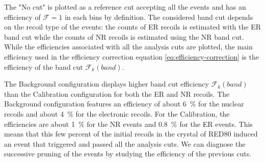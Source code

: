 The "No cut" is plotted as a reference cut accepting all the events and has an efficiency of $\mathcal{F}=1$ in each bins by definition. The considered band cut depends on the recoil type of the events: the counts of ER recoils is estimated with the ER band cut while the counts of NR recoils is estimated using the NR band cut.
While the efficiencies associated with all the analysis cuts are plotted, the main efficiency used in the efficiency correction equation \ref{eq:efficiency-correction} is the efficiency of the band cut $\mathcal{F}_k (band)$.

The Background configuration displays higher band cut efficiency $\mathcal{F}_k (band)$ than the Calibration configuration for both the ER and NR recoils. The Background configuration features an efficiency of about \SI{6}{\percent} for the nuclear recoils and about \SI{4}{\percent} for the electronic recoils. For the Calibration, the efficiencies are about \SI{1}{\percent} for the NR events and \SI{0.8}{\percent} for the ER events. This means that this few percent of the initial recoils in the crystal of RED80 induced an event that triggered and passed all the analysis cuts. We can diagnose the successive pruning of the events by studying the efficiency of the previous cuts.


